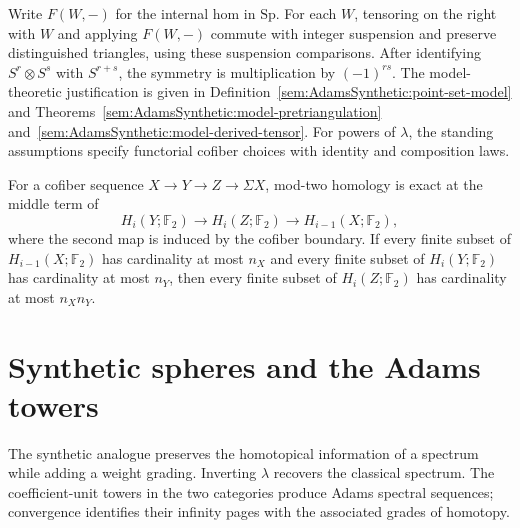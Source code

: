 \begin{definition}
Write $F(W,-)$ for the internal hom in $\mathrm{Sp}$. For each $W$,
tensoring on the right with $W$ and applying $F(W,-)$ commute with
integer suspension and preserve distinguished triangles, using these
suspension comparisons.
After identifying $S^r\otimes S^s$ with $S^{r+s}$, the symmetry is multiplication by $(-1)^{rs}$.
The model-theoretic justification is given in
Definition~\ref{sem:AdamsSynthetic:point-set-model} and
Theorems~\ref{sem:AdamsSynthetic:model-pretriangulation}
and~\ref{sem:AdamsSynthetic:model-derived-tensor}. For powers of $\lambda$, the standing assumptions specify
functorial cofiber choices with identity and composition laws.
\end{definition}

\begin{theorem}
\label{sem:AdamsSynthetic:homology-exact}
For a cofiber sequence $X\to Y\to Z\to\Sigma X$, mod-two
homology is exact at the middle term of
\[
 H_i(Y;\mathbb F_2)\longrightarrow H_i(Z;\mathbb F_2)
 \longrightarrow H_{i-1}(X;\mathbb F_2),
\]
where the second map is induced by the cofiber boundary. If every finite
subset of $H_{i-1}(X;\mathbb F_2)$ has cardinality at most $n_X$ and
every finite subset of $H_i(Y;\mathbb F_2)$ has cardinality at most
$n_Y$, then every finite subset of $H_i(Z;\mathbb F_2)$ has
cardinality at most $n_Xn_Y$.
\end{theorem}

\section{Synthetic spheres and the Adams towers}

The synthetic analogue preserves the homotopical information of a spectrum
while adding a weight grading. Inverting $\lambda$ recovers the classical
spectrum. The coefficient-unit towers in the two categories produce
Adams spectral sequences; convergence identifies their infinity pages
with the associated grades of homotopy.


